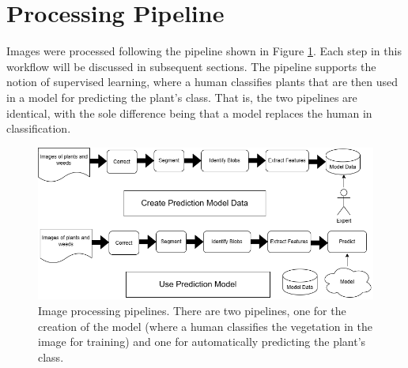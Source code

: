 \documentclass[letterpaper, notitlepage]{report}
\begin{document}
\section{Processing Pipeline}
Images were processed following the pipeline shown in Figure \ref{fig:workflow}. Each step in this workflow will be discussed in subsequent sections. The pipeline supports the notion of supervised learning, where a human classifies plants that are then used in a model for predicting the plant's class. That is, the two pipelines are identical, with the sole difference being that a model replaces the human in classification. 
\begin{figure}[H]
	\centering
	\includegraphics[width=0.90\linewidth]{./figures/workflow.png}
	\caption[Image processing workflow]{Image processing pipelines. There are two pipelines, one for the creation of the model (where a human classifies the vegetation in the image for training) and one for automatically predicting the plant’s class.}
	\label{fig:workflow}	
\end{figure}
\end{document}
